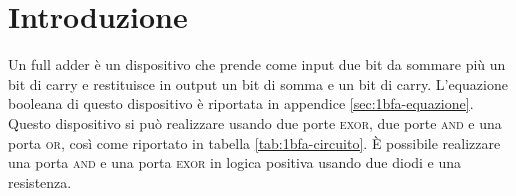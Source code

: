 \section{Introduzione}\label{sec:textscopo}
Un full adder è un dispositivo che prende come input due bit da sommare più un bit di carry e restituisce in output
un bit di somma e un bit di carry.
L'equazione booleana di questo dispositivo è riportata in appendice \ref{sec:1bfa-equazione}.
Questo dispositivo si può realizzare usando due porte \textsc{exor}, due porte \textsc{and} e una porta \textsc{or}, così come
riportato in tabella \ref{tab:1bfa-circuito}.
È possibile realizzare una porta \textsc{and} e una porta \textsc{exor} in logica positiva usando due diodi e una
resistenza.


